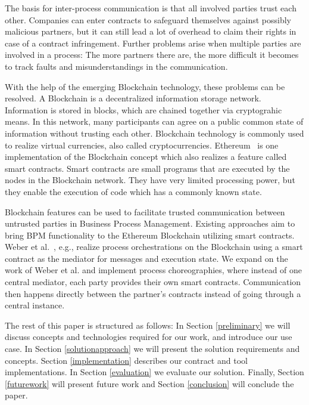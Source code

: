 \documentclass[runningheads]{llncs}
\begin{document}
The basis for inter-process communication is that all involved parties trust each other.
Companies can enter contracts to safeguard themselves against possibly malicious partners, but it can still lead a lot of overhead to claim their rights in case of a contract infringement.
Further problems arise when multiple parties are involved in a process:
The more partners there are, the more difficult it becomes to track faults and misunderstandings in the communication.

With the help of the emerging Blockchain technology, these problems can be resolved.
A Blockchain is a decentralized information storage network.
Information is stored in blocks, which are chained together via cryptograhic means.
In this network, many participants can agree on a public common state of information without trusting each other.
Blockchain technology is commonly used to realize virtual currencies, also called cryptocurrencies.
Ethereum~\cite{wood2014ethereum} is one implementation of the Blockchain concept which also realizes a feature called smart contracts.
Smart contracts are small programs that are executed by the nodes in the Blockchain network.
They have very limited processing power, but they enable the execution of code which has a commonly known state.

Blockchain features can be used to facilitate trusted communication between untrusted parties in Business Process Management.
Existing approaches aim to bring BPM functionality to the Ethereum Blockchain utilizing smart contracts.
Weber et al.~\cite{weber2016untrusted}, e.g., realize process orchestrations on the Blockchain using a smart contract as the mediator for messages and execution state.
We expand on the work of Weber et al. and implement process choreographies, where instead of one central mediator, each party provides their own smart contracts.
Communication then happens directly between the partner's contracts instead of going through a central instance.

The rest of this paper is structured as follows: In Section \ref{preliminary} we will discuss concepts and technologies required for our work, and introduce our use case.
In Section \ref{solutionapproach} we will present the solution requirements and concepts.
Section \ref{implementation} describes our contract and tool implementations.
In Section \ref{evaluation} we evaluate our solution.
Finally, Section \ref{futurework} will present future work and Section \ref{conclusion} will conclude the paper.
\end{document}
